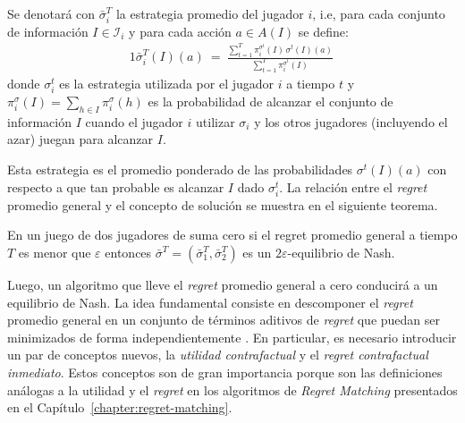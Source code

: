 Se denotará con $\bar{\sigma}_i^{T}$ la estrategia promedio del jugador $i$, i.e, para cada conjunto de información $I \in \mathcal{I}_i$ y para cada acción $a \in A(I)$ se define:
\begin{alignat}{1}
\bar{\sigma}_i^{T}(I)(a)\ =\ \frac{\sum_{t = 1}^T \pi^{\sigma^t}_i(I)\,\sigma^t(I)(a)}{\sum_{t = 1}^T \pi^{\sigma^t}_i(I)} \,
\end{alignat}
donde $\sigma^t_i$ es la estrategia utilizada por el jugador $i$ a tiempo $t$ y $\pi^\sigma_i(I) = \sum_{h \in I} \pi^\sigma_i(h)$ es la probabilidad de alcanzar el conjunto de información $I$ cuando el jugador $i$ utilizar $\sigma_i$ y los otros jugadores (incluyendo el azar) juegan para alcanzar $I$.

Esta estrategia es el promedio ponderado de las probabilidades $\sigma^t(I)(a)$ con respecto a que tan probable es alcanzar $I$ dado $\sigma_i^t$. La relación entre el \textit{regret} promedio general y el concepto de solución se muestra en el siguiente teorema.

\begin{theorem}
\label{theo:regret-nash}
En un juego de dos jugadores de suma cero si el regret promedio general a tiempo $T$ es menor que $\varepsilon$ entonces $\bar{\sigma}^{T}=(\bar\sigma^T_1,\bar\sigma^T_2)$ es un $2\varepsilon$-equilibrio de Nash.
\end{theorem}

Luego, un algoritmo que lleve el \mbox{\textit{regret}} promedio general a cero conducirá a un equilibrio de Nash. La idea fundamental consiste en descomponer el \textit{regret} promedio general en un conjunto de términos aditivos de \textit{regret} que puedan ser minimizados de forma independientemente \cite{bib:cfr}. En particular, es necesario introducir un par de conceptos nuevos, la \textit{utilidad contrafactual} y el \textit{regret contrafactual inmediato}. Estos conceptos son de gran importancia porque son las definiciones análogas a la utilidad y el \textit{regret} en los algoritmos de \textit{Regret Matching} presentados en el Capítulo~\ref{chapter:regret-matching}.

